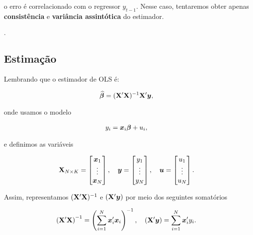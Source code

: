 \documentclass[11pt, oneside, a4paper, article]{article}
\numberwithin{equation}{section}
\begin{document}
\noindent
o erro é correlacionado com o regressor $y_{t-1}$.
Nesse caso, tentaremos obter apenas \textbf{consistência} e \textbf{variância assintótica} do estimador.

\begin{center}
.
\end{center}

\subsection{Estimação}

Lembrando que o estimador de OLS é:

\vspace{-1 em}
\begin{align*}
\widehat{\boldsymbol{\beta}} = (\mathbf{X}'\mathbf{X})^{-1}\mathbf{X}'\boldsymbol{y},
\end{align*}

\noindent
onde usamos o modelo

\vspace{-1 em}
\begin{align*}
	y_{i} = \boldsymbol{x}_{i} \boldsymbol{\beta} + u_{i},
\end{align*}

\noindent
e definimos as variáveis

\vspace{-1 em}
\begin{align*}
\mathbf{X}_{N \times K} =
\begin{bmatrix}
	\boldsymbol{x}_{1} \\ \vdots \\	\boldsymbol{x}_{N}	
\end{bmatrix},
\quad
\boldsymbol{y} =
\begin{bmatrix}
	y_{1} \\ \vdots \\ y_{N}
\end{bmatrix},
\quad
\boldsymbol{u} =
\begin{bmatrix}
	u_{1} \\ \vdots \\ u_{N}
\end{bmatrix}.
\end{align*}

\noindent
Assim, representamos $(\mathbf{X}'\mathbf{X})^{-1}$ e $(\mathbf{X}'\boldsymbol{y})$ por meio dos seguintes somatórios

\vspace{-1 em}
\begin{align*}
\left( \mathbf{X}'\mathbf{X} \right)^{-1} = \left( \sum_{i=1}^{N} \boldsymbol{x}_{i}' \boldsymbol{x}_{i} \right)^{-1} ,
\quad
\left( \mathbf{X}'\boldsymbol{y} \right) = \sum_{i=1}^{N} \boldsymbol{x}_{i}' y_{i}.
\end{align*}
\end{document}
